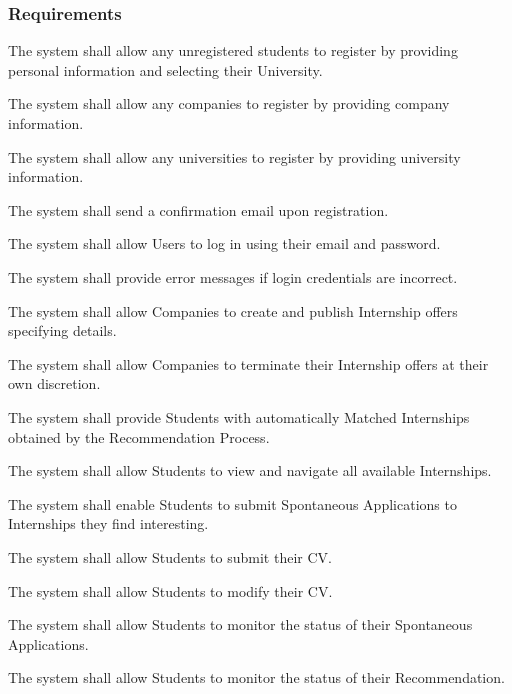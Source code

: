 \subsubsection{Requirements}
\begin{enumerate}[label={\color{titleColor}[R\arabic*]}]
    \item The system shall allow any unregistered students to register by providing personal information and selecting their University.
    \item The system shall allow any companies to register by providing company information.
    \item The system shall allow any universities to register by providing university information.
    \item The system shall send a confirmation email upon registration.
    \item The system shall allow Users to log in using their email and password.
    \item The system shall provide error messages if login credentials are incorrect.

    \item The system shall allow Companies to create and publish Internship offers specifying details.
    \item The system shall allow Companies to terminate their Internship offers at their own discretion.
    \item The system shall provide Students with automatically Matched Internships obtained by the Recommendation Process.
    \item The system shall allow Students to view and navigate all available Internships.
    \item The system shall enable Students to submit Spontaneous Applications to Internships they find interesting.
    \item The system shall allow Students to submit their CV.
    \item The system shall allow Students to modify their CV.
    \item The system shall allow Students to monitor the status of their Spontaneous Applications.
    \item The system shall allow Students to monitor the status of their Recommendation.


\end{enumerate}
